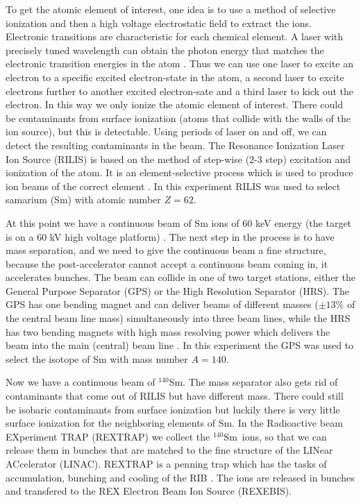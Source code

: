 \documentclass[twoside,english]{uiofysmaster/uiofysmaster}
\newcommand{\Sm}{$^{140}$Sm} %
\begin{document}
To get the atomic element of interest, one idea is to use a method of selective ionization and then a high voltage electrostatic field to extract the ions. Electronic transitions are characteristic for each chemical element. A laser with precisely tuned wavelength can obtain the photon energy that matches the electronic transition energies in the atom \cite{RILIS-web, RILIS2013}. Thus we can use one laser to excite an electron to a specific excited electron-state in the atom, a second laser to excite electrons further to another excited electron-sate and a third laser to kick out the electron. In this way we only ionize the atomic element of interest. There could be contaminants from surface ionization (atoms that collide with the walls of the ion source), but this is detectable. Using periods of laser on and off, we can detect the resulting contaminants in the beam. The Resonance Ionization Laser Ion Source (RILIS) is based on the method of step-wise (2-3 step) excitation and ionization of the atom. It is an element-selective process which is used to produce ion beams of the correct element \cite{RILIS}. In this experiment RILIS was used to select samarium (Sm) with atomic number $Z = 62$. 

At this point we have a continuous beam of Sm ions of 60 keV energy (the target is on a 60 kV high voltage platform) \cite{ISOLDE-web, TIF}. The next step in the process is to have mass separation, and we need to give the continuous beam a fine structure, because the post-accelerator cannot accept a continuous beam coming in, it accelerates bunches. The beam can collide in one of two target stations, either the General Purpose Separator (GPS) or the High Resolution Separator (HRS). The GPS has one bending magnet and can deliver beams of different masses ($\pm 13 \%$ of the central beam line mass) simultaneously into three beam lines, while the HRS has two bending magnets with high mass resolving power which delivers the beam into the main (central) beam line \cite{GPS, TIF}. In this experiment the GPS was used to select the isotope of Sm with mass number $A = 140$. 

Now we have a continuous beam of \Sm. The mass separator also gets rid of contaminants that come out of RILIS but have different mass. There could still be isobaric contaminants from surface ionization but luckily there is very little surface ionization for the neighboring elements of Sm. In the Radioactive beam EXperiment TRAP (REXTRAP) we collect the \Sm\ ions, so that we can release them in bunches that are matched to the fine structure of the LINear ACcelerator (LINAC). REXTRAP is a penning trap which has the tasks of accumulation, bunching and cooling of the RIB \cite{HIE-ISOLDE, REXTRAP1, REXTRAP2}. The ions are released in bunches and transfered to the REX Electron Beam Ion Source (REXEBIS).
\end{document}
